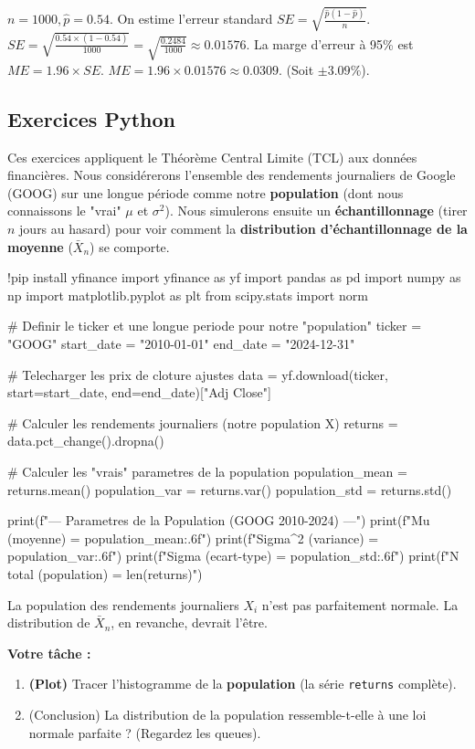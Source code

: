 \begin{correctionbox}
$n=1000, \hat{p}=0.54$.
On estime l'erreur standard $SE = \sqrt{\frac{\hat{p}(1-\hat{p})}{n}}$.
$SE = \sqrt{\frac{0.54 \times (1 - 0.54)}{1000}} = \sqrt{\frac{0.2484}{1000}} \approx 0.01576$.
La marge d'erreur à 95\% est $ME = 1.96 \times SE$.
$ME = 1.96 \times 0.01576 \approx 0.0309$.
(Soit $\pm 3.09\%$).
\end{correctionbox}

\subsection{Exercices Python}

Ces exercices appliquent le Théorème Central Limite (TCL) aux données financières. Nous considérerons l'ensemble des rendements journaliers de Google (GOOG) sur une longue période comme notre \textbf{population} (dont nous connaissons le "vrai" $\mu$ et $\sigma^2$). Nous simulerons ensuite un \textbf{échantillonnage} (tirer $n$ jours au hasard) pour voir comment la \textbf{distribution d'échantillonnage de la moyenne} ($\bar{X}_n$) se comporte.

\begin{codecell}
!pip install yfinance
import yfinance as yf
import pandas as pd
import numpy as np
import matplotlib.pyplot as plt
from scipy.stats import norm

# Definir le ticker et une longue periode pour notre "population"
ticker = "GOOG"
start_date = "2010-01-01"
end_date = "2024-12-31"

# Telecharger les prix de cloture ajustes
data = yf.download(ticker, start=start_date, end=end_date)["Adj Close"]

# Calculer les rendements journaliers (notre population X)
returns = data.pct_change().dropna()

# Calculer les "vrais" parametres de la population
population_mean = returns.mean()
population_var = returns.var()
population_std = returns.std()

print(f"--- Parametres de la Population (GOOG 2010-2024) ---")
print(f"Mu (moyenne) = {population_mean:.6f}")
print(f"Sigma^2 (variance) = {population_var:.6f}")
print(f"Sigma (ecart-type) = {population_std:.6f}")
print(f"N total (population) = {len(returns)}")
\end{codecell}

\begin{exercicebox}
La population des rendements journaliers $X_i$ n'est pas parfaitement normale. La distribution de $\bar{X}_n$, en revanche, devrait l'être.

\textbf{Votre tâche :}
\begin{enumerate}
    \item \textbf{(Plot)} Tracer l'histogramme de la \textbf{population} (la série \texttt{returns} complète).
    \item (Conclusion) La distribution de la population ressemble-t-elle à une loi normale parfaite ? (Regardez les queues).
\end{enumerate}
\end{exercicebox}

